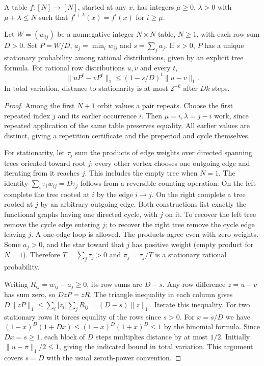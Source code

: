 \begin{theorem}\label{result70}
A table $f:[N]\to[N]$, started at any $x$, has integers $\mu\ge0$, $\lambda>0$ with $\mu+\lambda\le N$ such that $f^{i+\lambda}(x)=f^i(x)$ for $i\ge\mu$.

Let $W=(w_{ij})$ be a nonnegative integer $N\times N$ table, $N\ge1$, with each row sum $D>0$. Set $P=W/D$, $a_j=\min_i w_{ij}$ and $s=\sum_j a_j$. If $s>0$, $P$ has a unique stationary probability among rational distributions, given by an explicit tree formula. For rational row distributions $u,v$ and every $t$,
\[
 \|uP^t-vP^t\|_1\le (1-s/D)^t\|u-v\|_1.
\]
In total variation, distance to stationarity is at most $2^{-k}$ after $Dk$ steps.
\end{theorem}
\begin{proof}
Among the first $N+1$ orbit values a pair repeats. Choose the first repeated index $j$ and its earlier occurrence $i$. Then $\mu=i,\lambda=j-i$ work, since repeated application of the same table preserves equality. All earlier values are distinct, giving a repetition certificate and the preperiod and cycle themselves.

For stationarity, let $\tau_j$ sum the products of edge weights over directed spanning trees oriented toward root $j$: every other vertex chooses one outgoing edge and iterating from it reaches $j$. This includes the empty tree when $N=1$. The identity $\sum_i\tau_i w_{ij}=D\tau_j$ follows from a reversible counting operation. On the left complete the tree rooted at $i$ by the edge $i\to j$. On the right complete a tree rooted at $j$ by an arbitrary outgoing edge. Both constructions list exactly the functional graphs having one directed cycle, with $j$ on it. To recover the left tree remove the cycle edge entering $j$; to recover the right tree remove the cycle edge leaving $j$. A one-edge loop is allowed. The products agree even with zero weights. Some $a_j>0$, and the star toward that $j$ has positive weight (empty product for $N=1$). Therefore $T=\sum_j\tau_j>0$ and $\pi_j=\tau_j/T$ is a stationary rational probability.

Writing $R_{ij}=w_{ij}-a_j\ge0$, its row sums are $D-s$. Any row difference $z=u-v$ has sum zero, so $DzP=zR$. The triangle inequality in each column gives $D\|zP\|_1\le\sum_i |z_i|\sum_j R_{ij}=(D-s)\|z\|_1$. Iterate this inequality. For two stationary rows it forces equality of the rows since $s>0$. For $x=s/D$ we have $(1-x)^D(1+Dx)\le(1-x)^D(1+x)^D\le1$ by the binomial formula. Since $Dx=s\ge1$, each block of $D$ steps multiplies distance by at most $1/2$. Initially $\|u-\pi\|_1/2\le1$, giving the indicated bound in total variation. This argument covers $s=D$ with the usual zeroth-power convention.
\end{proof}

